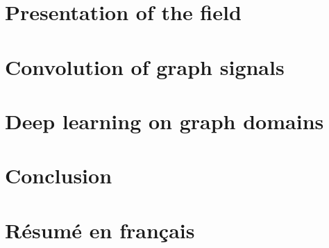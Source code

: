 \documentclass[12pt]{book}
\begin{document}
% 

%
%

\mainmatter
\pagestyle{headings}


%
%

  \chapter{Presentation of the field}\label{chap:1}
  \minitoc\newpage
  \newpage

  \newpage
  \newpage
  \newpage

%
%

\setcounter{chapter}{1}
\chapter{Convolution of graph signals}\label{chap:2}
  \minitoc\newpage
  \newpage

\newpage
\newpage
\newpage
\newpage
\newpage

%
%
 \setcounter{chapter}{2}
 \chapter{Deep learning on graph domains}\label{chap:3}
  \minitoc\newpage
  \newpage


 \newpage
 \newpage
 \newpage
 \newpage
 \newpage

%
%

\pagestyle{plain}
\chapter*{Conclusion}\label{chp:ccl}


%
%

\backmatter
\printbibliography[heading=bibintoc]

%
%

\clearpage
\chapter*{Résumé en français}\label{chp:rsm}

\end{document}
